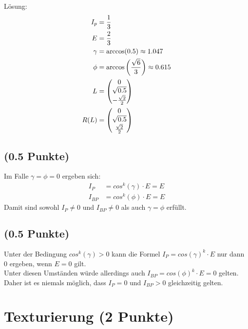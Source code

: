 \documentclass[a4paper,10pt,DIV=14]{article}
\begin{document}
Lösung:
\begin{align*}
I_p &= \frac{1}{3}\\
E &= \frac{2}{3} \\
\gamma &= \arccos(0.5) \approx 1.047\\
\phi &= \arccos\left(\frac{\sqrt{6}}{3}\right) \approx 0.615 \\
L &=  \begin{pmatrix} 0 \\ \sqrt{0.5} \\ -\frac{\sqrt{2}}{2} \end{pmatrix} \\
R(L) &= \begin{pmatrix} 0 \\ \sqrt{0.5} \\ \frac{\sqrt{2}}{2} \end{pmatrix}\\
\end{align*}

\subsection{(0.5 Punkte)} %
Im Falle $\gamma = \phi = 0$ ergeben sich:
\begin{align*}
    I_P &= cos^k(\gamma) \cdot E = E\\
    I_{BP} &= cos^k(\phi) \cdot E = E
\end{align*}
Damit sind sowohl $I_P \neq 0$ und $I_{BP} \neq 0$ als auch $\gamma = \phi$ erf\"ullt.
\subsection{(0.5 Punkte)}
Unter der Bedingung $cos^k(\gamma) > 0$ kann die Formel $I_P = cos(\gamma)^k \cdot E$ nur dann $0$ ergeben, wenn $E=0$ gilt.\\
Unter diesen Umst\"anden w\"urde allerdings auch $I_{BP} = cos(\phi)^k \cdot E = 0$ gelten.\\
Daher ist es niemals m\"oglich, dass $I_P = 0$ und $I_{BP} > 0$ gleichzeitig gelten.


\clearpage
\section{Texturierung (2 Punkte)} %
\end{document}
